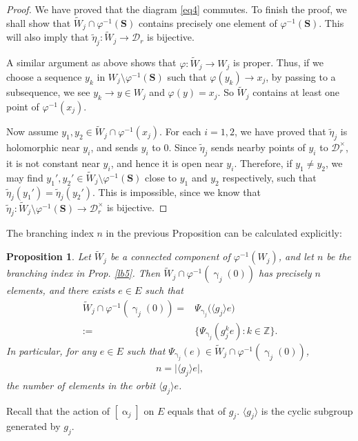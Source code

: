 \documentclass[11pt,b5paper,notitlepage]{article}
\theoremstyle{definition}
\theoremstyle{plain}
\newtheorem{pp}[df]{Proposition}
\newcommand{\mc}{\mathcal}
\newcommand{\wtd}{\widetilde}
\newcommand{\bk}[1]{\langle {#1}\rangle}
\newcommand{\Zbb}{\mathbb Z}
\newcommand{\Sbf}{\mathbf{S}}
\numberwithin{equation}{subsection}
\begin{document}
\begin{proof}
We have proved that the diagram \eqref{eq4} commutes. To finish the proof, we shall show that $\wtd W_j\cap\varphi^{-1}(\Sbf)$ contains precisely one element of $\varphi^{-1}(\Sbf)$. This will also imply that $\wtd\eta_j:\wtd W_j\rightarrow\mc D_r$ is bijective.


A similar argument as above shows that $\varphi:\wtd W_j\rightarrow W_j$ is proper. Thus, if we choose a sequence $y_k$ in $W_j\setminus\varphi^{-1}(\Sbf)$ such that $\varphi(y_k)\rightarrow x_j$, by passing to a subsequence, we see $y_k\rightarrow y\in W_j$ and $\varphi(y)=x_j$. So $\wtd W_j$ contains at least one point of $\varphi^{-1}(x_j)$.



Now assume $y_1,y_2\in\wtd W_j\cap\varphi^{-1}(x_j)$. For each $i=1,2$, we have proved that $\wtd\eta_j$ is holomorphic near $y_i$, and sends $y_i$ to $0$. Since $\wtd\eta_j$ sends nearby points of $y_i$ to $\mc D_r^\times$, it is not constant near $y_i$, and hence it is open near $y_i$.  Therefore, if $y_1\neq y_2$, we may find $y_1',y_2'\in\wtd W_j\setminus\varphi^{-1}(\Sbf)$ close to $y_1$ and $y_2$ respectively, such that $\wtd\eta_j(y_1')=\wtd\eta_j(y_2')$. This is impossible, since we know that $\wtd\eta_j:\wtd W_j\setminus\varphi^{-1}(\Sbf)\rightarrow\mc D_r^\times$ is bijective.
\end{proof}


The branching index $n$ in the previous Proposition can be calculated explicitly:

\begin{pp}\label{lb12}
Let $\wtd W_j$ be a connected component of $\varphi^{-1}(W_j)$, and let $n$ be the branching index in Prop. \ref{lb5}.  Then $\wtd W_j\cap\varphi^{-1}(\upgamma_j(0))$ has precisely $n$ elements, and there exists $e\in E$ such that
\begin{align*}
\wtd W_j\cap\varphi^{-1}(\upgamma_j(0))=&\Psi_{\upgamma_j}\big(\bk{g_j}e\big)\\
:=&\Big\{\Psi_{\upgamma_j}(g_j^ke):k\in\Zbb\Big\}.	
\end{align*}
In particular,  for any $e\in E$ such that $\Psi_{\upgamma_j}(e)\in \wtd W_j\cap\varphi^{-1}(\upgamma_j(0))$, 
\begin{align*}
n=\big|\bk{g_j}e\big|,	
\end{align*}
the number of elements in the orbit $\bk{g_j}e$.
\end{pp}

Recall that the action of $[\upalpha_j]$ on $E$ equals that of $g_j$. $\bk{g_j}$ is the cyclic subgroup generated by $g_j$.
\end{document}
